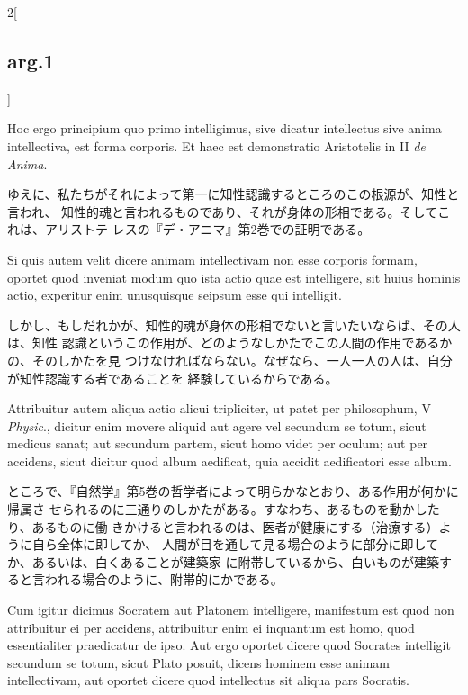 \documentclass[paper=a4paper,fontsize=10pt,jafontsize=9pt,titlepage]{jlreq}
\begin{document}
\begin{paracol}{2}[\subsection{arg.1}]
\switchcolumn*

 Hoc ergo principium quo primo intelligimus, sive dicatur intellectus sive anima
 intellectiva, est forma corporis. Et haec est demonstratio Aristotelis in II
 {\itshape de Anima}.


\switchcolumn

 ゆえに、私たちがそれによって第一に知性認識するところのこの根源が、知性と言われ、
 知性的魂と言われるものであり、それが身体の形相である。そしてこれは、アリストテ
 レスの『デ・アニマ』第2巻での証明である。
 
\switchcolumn*



 Si quis autem velit dicere animam intellectivam non esse corporis formam,
 oportet quod inveniat modum quo ista actio quae est intelligere, sit huius
 hominis actio, experitur enim unusquisque seipsum esse qui intelligit.

 \switchcolumn

しかし、もしだれかが、知性的魂が身体の形相でないと言いたいならば、その人は、知性
認識というこの作用が、どのようなしかたでこの人間の作用であるかの、そのしかたを見
つけなければならない。なぜなら、一人一人の人は、自分が知性認識する者であることを
経験しているからである。

\switchcolumn*

 Attribuitur autem aliqua actio alicui tripliciter, ut patet per philosophum, V
 {\itshape Physic}., dicitur enim movere aliquid aut agere vel secundum se
 totum, sicut medicus sanat; aut secundum partem, sicut homo videt per oculum;
 aut per accidens, sicut dicitur quod album aedificat, quia accidit aedificatori
 esse album.
 
\switchcolumn

 ところで、『自然学』第5巻の哲学者によって明らかなとおり、ある作用が何かに帰属さ
 せられるのに三通りのしかたがある。すなわち、あるものを動かしたり、あるものに働
 きかけると言われるのは、医者が健康にする（治療する）ように自ら全体に即してか、
 人間が目を通して見る場合のように部分に即してか、あるいは、白くあることが建築家
 に附帯しているから、白いものが建築すると言われる場合のように、附帯的にかである。

 
\switchcolumn*


 Cum igitur dicimus Socratem aut Platonem intelligere, manifestum est quod non
 attribuitur ei per accidens, attribuitur enim ei inquantum est homo, quod
 essentialiter praedicatur de ipso. Aut ergo oportet dicere quod Socrates
 intelligit secundum se totum, sicut Plato posuit, dicens hominem esse animam
 intellectivam, aut oportet dicere quod intellectus sit aliqua pars Socratis.
 

\end{paracol}
\end{document}
